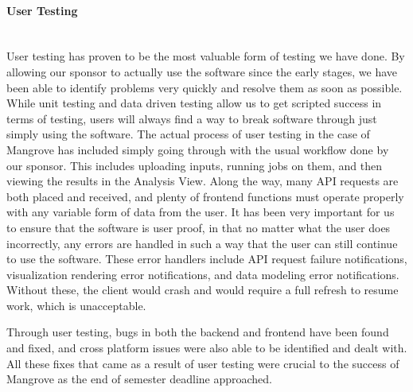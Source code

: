 \paragraph{User Testing} \mbox{}\\[\paragraphheaderspace]
User testing has proven to be the most valuable form of testing we have done. By allowing our sponsor to actually use the software since the early stages, we have been able to identify problems very quickly and resolve them as soon as possible. While unit testing and data driven testing allow us to get scripted success in terms of testing, users will always find a way to break software through just simply using the software. The actual process of user testing in the case of Mangrove has included simply going through with the usual workflow done by our sponsor. This includes uploading inputs, running jobs on them, and then viewing the results in the Analysis View. Along the way, many API requests are both placed and received, and plenty of frontend functions must operate properly with any variable form of data from the user. It has been very important for us to ensure that the software is user proof, in that no matter what the user does incorrectly, any errors are handled in such a way that the user can still continue to use the software. These error handlers include API request failure notifications, visualization rendering error notifications, and data modeling error notifications. Without these, the client would crash and would require a full refresh to resume work, which is unacceptable.\par
Through user testing, bugs in both the backend and frontend have been found and fixed, and cross platform issues were also able to be identified and dealt with. All these fixes that came as a result of user testing were crucial to the success of Mangrove as the end of semester deadline approached.
